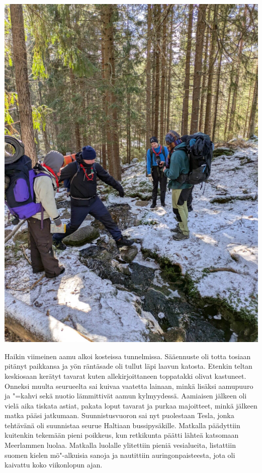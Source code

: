 \begin{multicols}{2}
\vfill\null
\columnbreak

\begin{center}
\noindent\includegraphics[width=1.0\linewidth,trim={0 0 0 0},clip]{assets/minihaikki5}
\end{center}

Haikin viimeinen aamu alkoi kosteissa tunnelmissa. Sääennuste oli totta tosiaan
pitänyt paikkansa ja yön räntäsade oli tullut läpi laavun katosta. Etenkin
teltan keskiosaan kerätyt tavarat kuten allekirjoittaneen toppatakki olivat
kastuneet. Onneksi muulta seurueelta sai kuivaa vaatetta lainaan, minkä lisäksi
aamupuuro ja "=kahvi sekä nuotio lämmittivät aamun kylmyydessä. Aamiaisen
jälkeen oli vielä aika tiskata astiat, pakata loput tavarat ja purkaa
majoitteet, minkä jälkeen matka pääsi jatkumaan. Suunnistusvuoron sai nyt
puolestaan Tesla, jonka tehtävänä oli suunnistaa seurue Haltiaan
bussipysäkille. Matkalla päädyttiin kuitenkin tekemään pieni poikkeus, kun
retkikunta päätti lähteä katsomaan Meerlammen luolaa. Matkalla luolalle
ylitettiin pieniä vesialueita, listattiin suomen kielen mö"-alkuisia sanoja ja
nautittiin auringonpaisteesta, jota oli kaivattu koko viikonlopun ajan.


\end{multicols}
